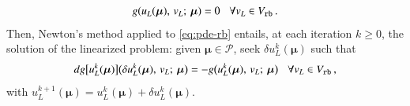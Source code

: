 \documentclass{elsarticle}
\numberwithin{equation}{section}
\theoremstyle{theorem}
\theoremstyle{definition}
\theoremstyle{remark}
\theoremstyle{proposition}
\numberwithin{figure}{section}
\newcommand{\bg}[1]{\boldsymbol{#1}}
\begin{document}
		\begin{equation}
			\label{eq:pde-rb}
			g(u_L(\bg{\mu}), \, v_L; \, \bg{\mu}) = 0 \hspace*{0.3cm} \forall v_L \in V_{\texttt{rb}} \, .
		\end{equation}
		Then, Newton's method applied to \eqref{eq:pde-rb} entails, at each iteration $k \geq 0$, the solution of the linearized problem: given $\bg{\mu} \in \mathcal{P}$, seek $\delta u_{L}^k(\bg{\mu})$ such that
		\begin{equation*}
			\label{eq:pde-rb-newton}
			dg \big[ u_{L}^k(\bg{\mu}) \big] \big( \delta u_{L}^k(\bg{\mu}), \, v_{L}; \, \bg{\mu} \big) = - g \big( u_{L}^k(\bg{\mu}), \, v_{L}; \, \bg{\mu} \big) \hspace*{0.3cm} \forall v_{L} \in V_{\texttt{rb}} \, ,
		\end{equation*}
		with $u_{L}^{k+1}(\bg{\mu}) = u_{L}^k(\bg{\mu}) + \delta u_{L}^k(\bg{\mu})$. 
		
\end{document}
